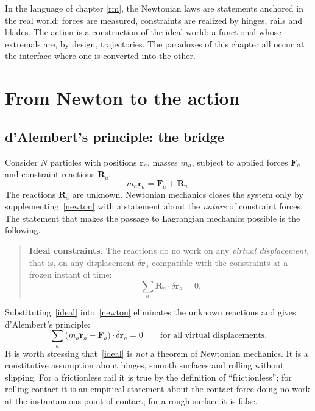 In the language of chapter \ref{rm}, the Newtonian laws are
statements anchored in the real world: forces are measured, constraints are
realized by hinges, rails and blades. The action is a construction of the ideal
world: a functional whose extremals are, by design, trajectories. The
paradoxes of this chapter all occur at the interface where one is converted
into the other.

\section{From Newton to the action}
\label{newton-to-action}

\subsection{d'Alembert's principle: the bridge}

Consider $N$ particles with positions $\mathbf r_a$, masses $m_a$, subject to
applied forces $\mathbf F_a$ and constraint reactions $\mathbf R_a$:
\begin{equation}
  m_a\ddot{\mathbf r}_a=\mathbf F_a+\mathbf R_a .
  \label{newton}
\end{equation}
The reactions $\mathbf R_a$ are unknown. Newtonian mechanics closes the system
only by supplementing~\eqref{newton} with a statement about the
\emph{nature} of constraint forces. The statement that makes the passage to
Lagrangian mechanics possible is the following.

\begin{quote}
\textbf{Ideal constraints.} The reactions do no work on any \emph{virtual
displacement}, that is, on any displacement $\delta\mathbf r_a$ compatible with
the constraints at a frozen instant of time:
\begin{equation}
  \sum_a \mathbf R_a\cdot\delta\mathbf r_a = 0 .
  \label{ideal}
\end{equation}
\end{quote}

Substituting~\eqref{ideal} into~\eqref{newton} eliminates the unknown
reactions and gives d'Alembert's principle:
\begin{equation}
  \sum_a\bigl(m_a\ddot{\mathbf r}_a-\mathbf F_a\bigr)\cdot\delta\mathbf r_a=0
  \qquad\text{for all virtual displacements.}
  \label{dalembert}
\end{equation}
It is worth stressing that~\eqref{ideal} is \emph{not} a theorem of
Newtonian mechanics. It is a constitutive assumption about hinges, smooth
surfaces and rolling without slipping. For a frictionless rail it is true by
the definition of ``frictionless''; for rolling contact it is an empirical
statement about the contact force doing no work at the instantaneous point of
contact; for a rough surface it is false.

